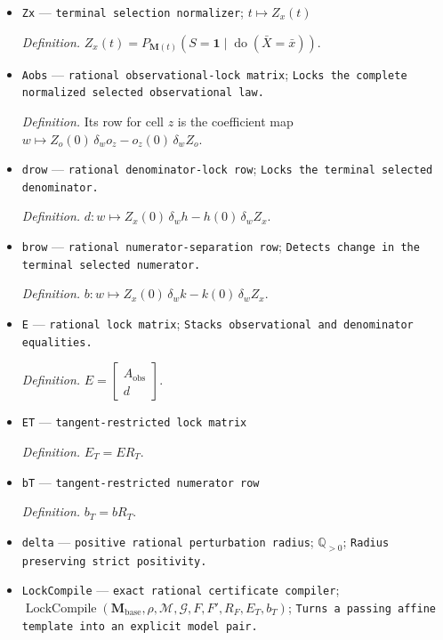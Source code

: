\documentclass{article}
\begin{document}
\begin{itemize}
  \item \texttt{Zx} --- \texttt{terminal selection normalizer}; \(t\mapsto Z_x(t)\)
  \par\smallskip\noindent\emph{Definition.} \(Z_x(t)=P_{\mathbf M(t)}(S=\mathbf 1\mid\operatorname{do}(\bar X=\bar x))\).
  \item \texttt{Aobs} --- \texttt{rational observational-\allowbreak{}lock matrix}; \texttt{Locks the complete normalized selected observational law.}
  \par\smallskip\noindent\emph{Definition.} Its row for cell \(z\) is the coefficient map \(w\mapsto Z_o(0)\,\delta_w o_z-o_z(0)\,\delta_w Z_o\).
  \item \texttt{drow} --- \texttt{rational denominator-\allowbreak{}lock row}; \texttt{Locks the terminal selected denominator.}
  \par\smallskip\noindent\emph{Definition.} \(d:w\mapsto Z_x(0)\,\delta_w h-h(0)\,\delta_w Z_x\).
  \item \texttt{brow} --- \texttt{rational numerator-\allowbreak{}separation row}; \texttt{Detects change in the terminal selected numerator.}
  \par\smallskip\noindent\emph{Definition.} \(b:w\mapsto Z_x(0)\,\delta_w k-k(0)\,\delta_w Z_x\).
  \item \texttt{E} --- \texttt{rational lock matrix}; \texttt{Stacks observational and denominator equalities.}
  \par\smallskip\noindent\emph{Definition.} \(E=\begin{bmatrix}A_{\mathrm{obs}}\\ d\end{bmatrix}\).
  \item \texttt{ET} --- \texttt{tangent-\allowbreak{}restricted lock matrix}
  \par\smallskip\noindent\emph{Definition.} \(E_T=ER_T\).
  \item \texttt{bT} --- \texttt{tangent-\allowbreak{}restricted numerator row}
  \par\smallskip\noindent\emph{Definition.} \(b_T=bR_T\).
  \item \texttt{delta} --- \texttt{positive rational perturbation radius}; \(\mathbb Q_{>0}\); \texttt{Radius preserving strict positivity.}
  \item \texttt{LockCompile} --- \texttt{exact rational certificate compiler}; \(\operatorname{LockCompile}(\mathbf M_{\mathrm{base}},\rho,\mathcal M,\mathcal G,F,F',R_F,E_T,b_T)\); \texttt{Turns a passing affine template into an explicit model pair.}

\end{itemize}
\end{document}
